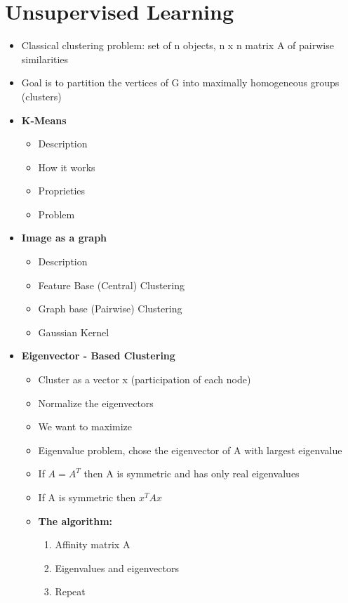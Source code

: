 \chapter{Unsupervised Learning}
\begin{itemize}
    \item Classical clustering problem: set of n objects, n x n matrix A of pairwise similarities
    \item Goal is to partition the vertices of G into maximally homogeneous groups (clusters)
    \item \textbf{K-Means}
    \begin{itemize}
        \item Description
        \item How it works
        \item Proprieties
        \item Problem
    \end{itemize}
    \item \textbf{Image as a graph} 
    \begin{itemize}
        \item Description
        \item Feature Base (Central) Clustering
        \item Graph base (Pairwise) Clustering
        \item Gaussian Kernel
    \end{itemize}
    \item \textbf{Eigenvector - Based Clustering}
    \begin{itemize}
        \item Cluster as a vector x (participation of each node)
        \item Normalize the eigenvectors
        \item We want to maximize 
        \item Eigenvalue problem, chose the eigenvector of A with largest eigenvalue
        \item If \(A = A^T\) then A is symmetric and has only real eigenvalues
        \item If A is symmetric then \(x^TAx\)
        \item \textbf{The algorithm:}
        \begin{enumerate}
            \item Affinity matrix A
            \item Eigenvalues and eigenvectors
            \item Repeat
            \begin{enumerate}

\end{enumerate}
\end{enumerate}
\end{itemize}
\end{itemize}
